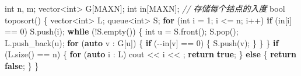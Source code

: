 \documentclass[
]{article}
\newenvironment{Shaded}{}{}
\newcommand{\CharTok}[1]{\textcolor[rgb]{0.25,0.44,0.63}{#1}}
\newcommand{\CommentTok}[1]{\textcolor[rgb]{0.38,0.63,0.69}{\textit{#1}}}
\newcommand{\ControlFlowTok}[1]{\textcolor[rgb]{0.00,0.44,0.13}{\textbf{#1}}}
\newcommand{\DataTypeTok}[1]{\textcolor[rgb]{0.56,0.13,0.00}{#1}}
\newcommand{\DecValTok}[1]{\textcolor[rgb]{0.25,0.63,0.44}{#1}}
\newcommand{\KeywordTok}[1]{\textcolor[rgb]{0.00,0.44,0.13}{\textbf{#1}}}
\newcommand{\NormalTok}[1]{#1}
\newcommand{\OperatorTok}[1]{\textcolor[rgb]{0.40,0.40,0.40}{#1}}
\begin{document}
\begin{Shaded}
\begin{Highlighting}[]
\DataTypeTok{int}\NormalTok{ n}\OperatorTok{,}\NormalTok{ m}\OperatorTok{;}
\NormalTok{vector}\OperatorTok{\textless{}}\DataTypeTok{int}\OperatorTok{\textgreater{}}\NormalTok{ G}\OperatorTok{[}\NormalTok{MAXN}\OperatorTok{];}
\DataTypeTok{int}\NormalTok{ in}\OperatorTok{[}\NormalTok{MAXN}\OperatorTok{];}  \CommentTok{// 存储每个结点的入度}
\DataTypeTok{bool}\NormalTok{ toposort}\OperatorTok{()} \OperatorTok{\{}
\NormalTok{  vector}\OperatorTok{\textless{}}\DataTypeTok{int}\OperatorTok{\textgreater{}}\NormalTok{ L}\OperatorTok{;}
\NormalTok{  queue}\OperatorTok{\textless{}}\DataTypeTok{int}\OperatorTok{\textgreater{}}\NormalTok{ S}\OperatorTok{;}
  \ControlFlowTok{for} \OperatorTok{(}\DataTypeTok{int}\NormalTok{ i }\OperatorTok{=} \DecValTok{1}\OperatorTok{;}\NormalTok{ i }\OperatorTok{\textless{}=}\NormalTok{ n}\OperatorTok{;}\NormalTok{ i}\OperatorTok{++)}
    \ControlFlowTok{if} \OperatorTok{(}\NormalTok{in}\OperatorTok{[}\NormalTok{i}\OperatorTok{]} \OperatorTok{==} \DecValTok{0}\OperatorTok{)}\NormalTok{ S}\OperatorTok{.}\NormalTok{push}\OperatorTok{(}\NormalTok{i}\OperatorTok{);}
  \ControlFlowTok{while} \OperatorTok{(!}\NormalTok{S}\OperatorTok{.}\NormalTok{empty}\OperatorTok{())} \OperatorTok{\{}
    \DataTypeTok{int}\NormalTok{ u }\OperatorTok{=}\NormalTok{ S}\OperatorTok{.}\NormalTok{front}\OperatorTok{();}
\NormalTok{    S}\OperatorTok{.}\NormalTok{pop}\OperatorTok{();}
\NormalTok{    L}\OperatorTok{.}\NormalTok{push\_back}\OperatorTok{(}\NormalTok{u}\OperatorTok{);}
    \ControlFlowTok{for} \OperatorTok{(}\KeywordTok{auto}\NormalTok{ v }\OperatorTok{:}\NormalTok{ G}\OperatorTok{[}\NormalTok{u}\OperatorTok{])} \OperatorTok{\{}
      \ControlFlowTok{if} \OperatorTok{({-}{-}}\NormalTok{in}\OperatorTok{[}\NormalTok{v}\OperatorTok{]} \OperatorTok{==} \DecValTok{0}\OperatorTok{)} \OperatorTok{\{}\NormalTok{ S}\OperatorTok{.}\NormalTok{push}\OperatorTok{(}\NormalTok{v}\OperatorTok{);} \OperatorTok{\}}
    \OperatorTok{\}}
  \OperatorTok{\}}
  \ControlFlowTok{if} \OperatorTok{(}\NormalTok{L}\OperatorTok{.}\NormalTok{size}\OperatorTok{()} \OperatorTok{==}\NormalTok{ n}\OperatorTok{)} \OperatorTok{\{}
    \ControlFlowTok{for} \OperatorTok{(}\KeywordTok{auto}\NormalTok{ i }\OperatorTok{:}\NormalTok{ L}\OperatorTok{)}\NormalTok{ cout }\OperatorTok{\textless{}\textless{}}\NormalTok{ i }\OperatorTok{\textless{}\textless{}} \CharTok{\textquotesingle{} \textquotesingle{}}\OperatorTok{;}
    \ControlFlowTok{return} \KeywordTok{true}\OperatorTok{;}
  \OperatorTok{\}} \ControlFlowTok{else} \OperatorTok{\{}
    \ControlFlowTok{return} \KeywordTok{false}\OperatorTok{;}
  \OperatorTok{\}}
\OperatorTok{\}}
\end{Highlighting}
\end{Shaded}
\end{document}
